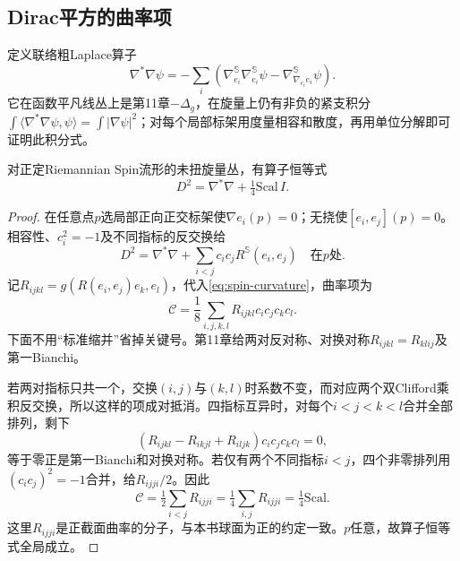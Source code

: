 \subsection{Dirac平方的曲率项}
定义联络粗Laplace算子
\[
 \nabla^*\nabla\psi=-\sum_i\left(
 \nabla^{\mathbb S}_{e_i}\nabla^{\mathbb S}_{e_i}\psi
 -\nabla^{\mathbb S}_{\nabla_{e_i}e_i}\psi\right).
\]
它在函数平凡线丛上是第11章$-\Delta_g$，在旋量上仍有非负的紧支积分$\int\langle\nabla^*\nabla\psi,\psi\rangle=\int|\nabla\psi|^2$；对每个局部标架用度量相容和散度，再用单位分解即可证明此积分式。

\begin{theorem}\label{thm:lichnerowicz}
对正定Riemannian Spin流形的未扭旋量丛，有算子恒等式
\begin{equation}\label{eq:lichnerowicz}
 D^2=\nabla^*\nabla+\tfrac14\mathrm{Scal}\,I.
\end{equation}
\end{theorem}
\begin{proof}
在任意点$p$选局部正向正交标架使$\nabla e_i(p)=0$；无挠使$[e_i,e_j](p)=0$。相容性、$c_i^2=-1$及不同指标的反交换给
\[
 D^2=\nabla^*\nabla+\sum_{i<j}c_ic_jR^{\mathbb S}(e_i,e_j)
 \quad\text{在$p$处}.
\]
记$R_{ijkl}=g(R(e_i,e_j)e_k,e_l)$，代入\eqref{eq:spin-curvature}，曲率项为
\[
 \mathcal C=\frac18\sum_{i,j,k,l}R_{ijkl}c_ic_jc_kc_l.
\]
下面不用“标准缩并”省掉关键号。第11章给两对反对称、对换对称$R_{ijkl}=R_{klij}$及第一Bianchi。

若两对指标只共一个，交换$(i,j)$与$(k,l)$时系数不变，而对应两个双Clifford乘积反交换，所以这样的项成对抵消。四指标互异时，对每个$i<j<k<l$合并全部排列，剩下
\[
 (R_{ijkl}-R_{ikjl}+R_{iljk})c_ic_jc_kc_l=0,
\]
等于零正是第一Bianchi和对换对称。若仅有两个不同指标$i<j$，四个非零排列用$(c_ic_j)^2=-1$合并，给$R_{ijji}/2$。因此
\[
 \mathcal C=\tfrac12\sum_{i<j}R_{ijji}
 =\tfrac14\sum_{i,j}R_{ijji}=\tfrac14\mathrm{Scal}.
\]
这里$R_{ijji}$是正截面曲率的分子，与本书球面为正的约定一致。$p$任意，故算子恒等式全局成立。
\end{proof}

